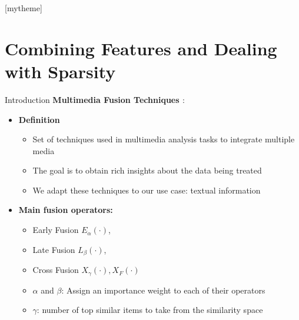 \documentclass[10pt,xcolor=table]{beamer}
\begin{document}
[mytheme]
\section[Contributions in Detail]{Combining Features and Dealing with Sparsity}                  

      
\begin{frame}{Introduction}
\large \textbf{Multimedia Fusion Techniques \cite{AtreyHEK10,ahn2010link}}:
\begin{itemize}
\item \large \textbf{Definition}
	\begin{itemize}
	\item Set of techniques used in multimedia analysis tasks to integrate multiple media 
	\item The goal is to obtain rich insights about the data being treated
	\item We adapt these techniques to our use case: textual information
	\end{itemize}
\item \textbf{Main fusion operators:}
	\begin{itemize}
	\item Early Fusion $E_\alpha(\cdot)$, 
	\item Late Fusion $L_\beta(\cdot)$, 
	\item Cross Fusion $X_\gamma(\cdot), X_F(\cdot)$
	\item $\alpha$ and $\beta$: Assign an importance weight to each of their operators 
	\item $\gamma$: number of top similar items to take from the similarity space
	\end{itemize}

\end{itemize}
\end{frame}
\end{document}
